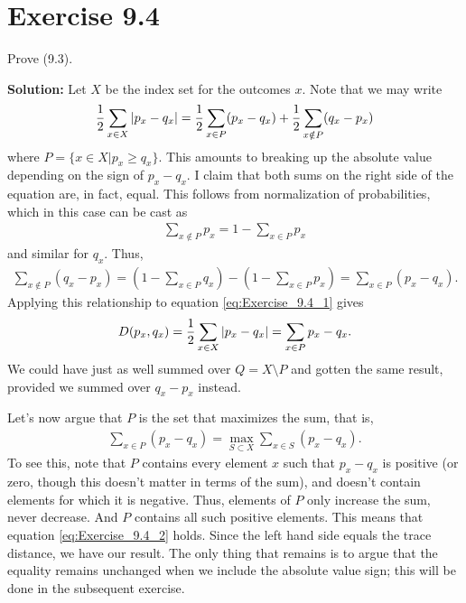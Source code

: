 \documentclass{book}
\begin{document}
\section*{Exercise 9.4}
    Prove (9.3).
    
    \textbf{Solution:} Let $X$ be the index set for the outcomes $x$. Note that we may write
    \begin{align} \label{eq:Exercise_9.4_1}
        \frac{1}{2}\sum_{x\in X} \abs{p_x-q_x} = \frac{1}{2}\sum_{x\in P} (p_x-q_x) + \frac{1}{2} \sum_{x\notin P} (q_x-p_x)
    \end{align}
    where $P = \{x\in X| p_x \geq q_x\}$. This amounts to breaking up the absolute value depending on the sign of $p_x-q_x$. I claim that both sums on the right side of the equation are, in fact, equal. This follows from normalization of probabilities, which in this case can be cast as 
    \begin{align}
        \sum_{x\notin P} p_x = 1-\sum_{x\in P} p_x
    \end{align}
    and similar for $q_x$. Thus,
    \begin{align}
        \sum_{x\notin P} (q_x-p_x) = (1-\sum_{x\in P}q_x) - (1-\sum_{x\in P}p_x) = \sum_{x\in P }(p_x - q_x).
    \end{align}
    Applying this relationship to equation \eqref{eq:Exercise_9.4_1} gives
    \begin{align}
        D(p_x, q_x) = \frac{1}{2}\sum_{x\in X} \abs{p_x-q_x} = \sum_{x\in P} p_x - q_x.
    \end{align}
    We could have just as well summed over $Q = X\setminus P$ and gotten the same result, provided we summed over $q_x-p_x$ instead. 
    
    Let's now argue that $P$ is the set that maximizes the sum, that is,
    \begin{align} \label{eq:Exercise_9.4_2}
        \sum_{x\in P } (p_x-q_x) = \max_{S\subset X} \sum_{x\in S} (p_x -q_x).
    \end{align}
    To see this, note that $P$ contains every element $x$ such that $p_x-q_x$ is positive (or zero, though this doesn't matter in terms of the sum), and doesn't contain elements for which it is negative. Thus, elements of $P$ only increase the sum, never decrease. And $P$ contains all such positive elements. This means that equation \eqref{eq:Exercise_9.4_2} holds. Since the left hand side equals the trace distance, we have our result. The only thing that remains is to argue that the equality remains unchanged when we include the absolute value sign; this will be done in the subsequent exercise. 
    
\end{document}
